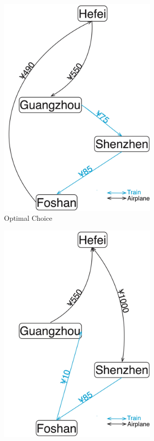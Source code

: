 \documentclass{article}
\begin{document}
\begin{figure}[!ht]
\begin{subfigure}{0.3\textwidth}
    \includegraphics[width=0.85\textwidth]{pic/optimal.jpg}
    \caption{Optimal Choice}%
    \label{fig:Optimalchoice}
  \end{subfigure}%
  \hfill %
  \begin{subfigure}{0.3\textwidth}
    \includegraphics[width=0.85\textwidth]{pic/higher_price.jpg}

\end{subfigure}
\end{figure}
\end{document}
